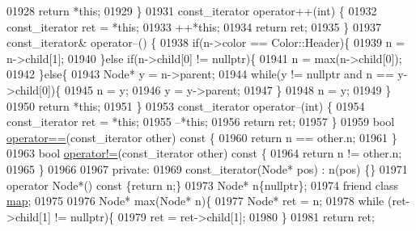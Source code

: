 \begin{DoxyCode}
01928             \textcolor{keywordflow}{return} *\textcolor{keyword}{this};
01929         \}
01931         const\_iterator operator++(\textcolor{keywordtype}{int})  \{
01932             const\_iterator ret = *\textcolor{keyword}{this};
01933             ++*\textcolor{keyword}{this};
01934             \textcolor{keywordflow}{return} ret;
01935         \}
01937         const\_iterator& operator--()  \{
01938             \textcolor{keywordflow}{if}(n->color == Color::Header)\{
01939                 n = n->child[1];
01940             \}\textcolor{keywordflow}{else} \textcolor{keywordflow}{if}(n->child[0] != \textcolor{keyword}{nullptr})\{
01941                 n = max(n->child[0]);
01942             \}\textcolor{keywordflow}{else}\{
01943                 Node* y = n->parent;
01944                 \textcolor{keywordflow}{while}(y != \textcolor{keyword}{nullptr} and n == y->child[0])\{
01945                     n = y;
01946                     y = y->parent;
01947                 \}
01948                 n = y;
01949             \}
01950             \textcolor{keywordflow}{return} *\textcolor{keyword}{this};
01951         \}
01953         const\_iterator operator--(\textcolor{keywordtype}{int})  \{
01954             const\_iterator ret = *\textcolor{keyword}{this};
01955             --*\textcolor{keyword}{this};
01956             \textcolor{keywordflow}{return} ret;
01957         \}
01959         \textcolor{keywordtype}{bool} \hyperlink{classaed2_1_1map_abfc51b39670220e79037ac067006e933_abfc51b39670220e79037ac067006e933}{operator==}(const\_iterator other)\textcolor{keyword}{ const  }\{
01960             \textcolor{keywordflow}{return} n == other.n;
01961         \}
01963         \textcolor{keywordtype}{bool} \hyperlink{classaed2_1_1map_abce0fa35c5b25fd67111c2e704616f09_abce0fa35c5b25fd67111c2e704616f09}{operator!=}(const\_iterator other)\textcolor{keyword}{ const  }\{
01964             \textcolor{keywordflow}{return} n != other.n;
01965         \}
01966 
01967     \textcolor{keyword}{private}:
01969         const\_iterator(Node* pos) : n(pos) \{\}
01971         \textcolor{keyword}{operator} Node*() \textcolor{keyword}{const} \{\textcolor{keywordflow}{return} n;\}
01973         Node* n\{\textcolor{keyword}{nullptr}\};
01974         \textcolor{keyword}{friend} \textcolor{keyword}{class }\hyperlink{classaed2_1_1map}{map};
01975 
01976         Node* max(Node* n)\{
01977             Node* ret = n;
01978             \textcolor{keywordflow}{while} (ret->child[1] != \textcolor{keyword}{nullptr})\{
01979                 ret = ret->child[1];
01980             \}
01981             \textcolor{keywordflow}{return} ret;

\end{DoxyCode}
